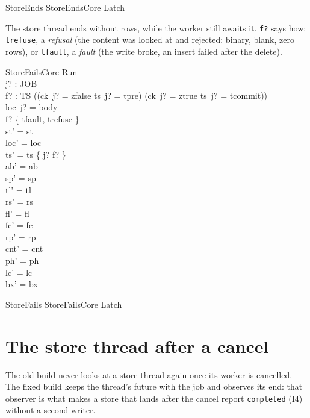 \documentclass[a4paper,10pt,fleqn]{article}
\newcommand{\field}[1]{\texttt{#1}}
\begin{document}
\begin{zed}
StoreEnds  StoreEndsCore \land Latch
\end{zed}

The store thread ends without rows, while the worker still awaits it. \field{f?}
says how: \field{trefuse}, a \emph{refusal} (the content was looked at and rejected:
binary, blank, zero rows), or \field{tfault}, a \emph{fault} (the write broke, an
insert failed after the delete).

\begin{schema}{StoreFailsCore}
\Delta Run \\ j? : JOB \\ f? : TS
\where
((ck~j? = zfalse \land ts~j? = tpre) \lor (ck~j? = ztrue \land ts~j? = tcommit)) \\
loc~j? = body \\
f? \in \{ tfault, trefuse \} \\
st' = st \\
loc' = loc \\
ts' = ts \oplus \{ j? \mapsto f? \} \\
ab' = ab \\
sp' = sp \\
tl' = tl \\
rs' = rs \\
fl' = fl \\
fc' = fc \\
rp' = rp \\
cnt' = cnt \\
ph' = ph \\
lc' = lc \\
bx' = bx
\end{schema}

\begin{zed}
StoreFails  StoreFailsCore \land Latch
\end{zed}


\section{The store thread after a cancel}
\label{sec:detached}

The old build never looks at a store thread again once its worker is cancelled.
The fixed build keeps the thread's future with the job and observes its end: that
observer is what makes a store that lands after the cancel report
\field{completed} (I4) without a second writer.
\end{document}
